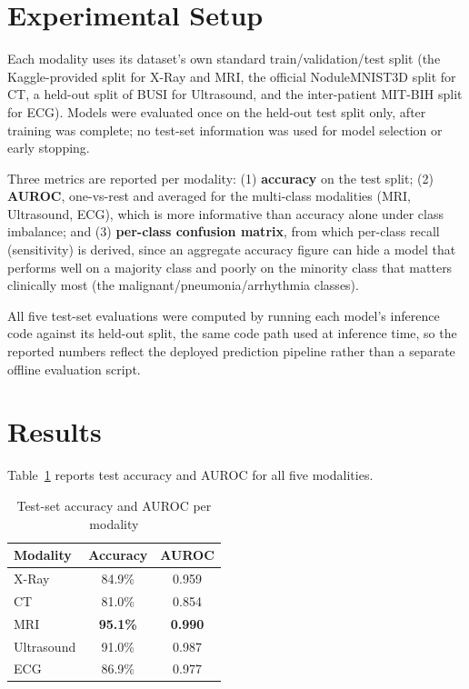 \documentclass[conference]{IEEEtran}
\begin{document}
\section{Experimental Setup}

Each modality uses its dataset's own standard train/validation/test split (the Kaggle-provided split for X-Ray and MRI, the official NoduleMNIST3D split for CT, a held-out split of BUSI for Ultrasound, and the inter-patient MIT-BIH split for ECG). Models were evaluated once on the held-out test split only, after training was complete; no test-set information was used for model selection or early stopping.

Three metrics are reported per modality: (1) \textbf{accuracy} on the test split; (2) \textbf{AUROC}, one-vs-rest and averaged for the multi-class modalities (MRI, Ultrasound, ECG), which is more informative than accuracy alone under class imbalance; and (3) \textbf{per-class confusion matrix}, from which per-class recall (sensitivity) is derived, since an aggregate accuracy figure can hide a model that performs well on a majority class and poorly on the minority class that matters clinically most (the malignant/pneumonia/arrhythmia classes).

All five test-set evaluations were computed by running each model's inference code against its held-out split, the same code path used at inference time, so the reported numbers reflect the deployed prediction pipeline rather than a separate offline evaluation script.

\section{Results}
\label{sec:results}

Table~\ref{tab:results} reports test accuracy and AUROC for all five modalities.

\begin{table}[t]
\centering
\caption{Test-set accuracy and AUROC per modality}
\label{tab:results}
\begin{tabular}{@{}lcc@{}}
\toprule
\textbf{Modality} & \textbf{Accuracy} & \textbf{AUROC} \\
\midrule
X-Ray & 84.9\% & 0.959 \\
CT & 81.0\% & 0.854 \\
MRI & \textbf{95.1\%} & \textbf{0.990} \\
Ultrasound & 91.0\% & 0.987 \\
ECG & 86.9\% & 0.977 \\
\bottomrule
\end{tabular}
\end{table}
\end{document}

